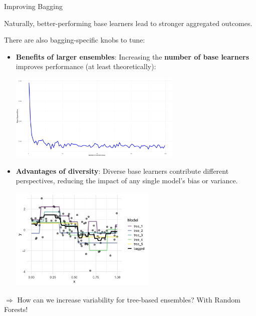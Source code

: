\documentclass[11pt,compress,t,notes=noshow, xcolor=table]{beamer}
\begin{document}
\begin{vbframe}{Improving Bagging}

Naturally, better-performing base learners lead to stronger aggregated outcomes. \\

\vspace{1em}

There are also bagging-specific knobs to tune:
\begin{itemize}
  \item \textbf{Benefits of larger ensembles}: Increasing the \textbf{number of base learners} improves performance (at least theoretically):
  \begin{center}
  \includegraphics[width=0.65\textwidth]{figure/bagging-ntree_MSE.png}
  \end{center}
  
  \vspace{2em}

  \item \textbf{Advantages of diversity}: Diverse base learners contribute different perspectives, reducing the impact of any single model's bias or variance.
  \begin{center}
  \includegraphics[width=0.55\textwidth]{figure/bagging-fit.png}
  \end{center}
\end{itemize}

$\Rightarrow$ How can we increase variability for tree-based ensembles? With Random Forests!

\end{vbframe}

\endlecture
\end{document}
